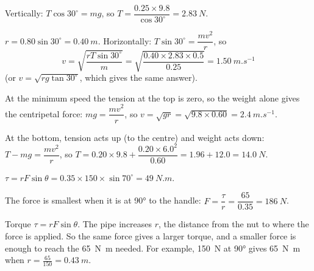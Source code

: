 \documentclass[12pt]{article}
\begin{document}
\ansq
{}
\begin{crit}
\end{crit}
\sample
Vertically: $T\cos 30^\circ = mg$, so $T = \dfrac{0.25 \times 9.8}{\cos 30^\circ} = \qty{2.83}{N}$.
\begin{crit}
\end{crit}
\sample
$r = 0.80\sin 30^\circ = \qty{0.40}{m}$. Horizontally: $T\sin 30^\circ = \dfrac{mv^2}{r}$, so
\[ v = \sqrt{\frac{rT\sin 30^\circ}{m}} = \sqrt{\frac{0.40 \times 2.83 \times 0.5}{0.25}} = \qty{1.50}{m.s^{-1}} \]
(or $v = \sqrt{rg\tan 30^\circ}$, which gives the same answer).

\ansq
{}
\begin{crit}
\end{crit}
\sample
At the minimum speed the tension at the top is zero, so the weight alone gives the centripetal
force: $mg = \dfrac{mv^2}{r}$, so $v = \sqrt{gr} = \sqrt{9.8 \times 0.60} = \qty{2.4}{m.s^{-1}}$.
\begin{crit}
\end{crit}
\sample
At the bottom, tension acts up (to the centre) and weight acts down:
$T - mg = \dfrac{mv^2}{r}$, so
$T = 0.20 \times 9.8 + \dfrac{0.20 \times 6.0^2}{0.60} = 1.96 + 12.0 = \qty{14.0}{N}$.

\ansq
{}
\begin{crit}
\end{crit}
\sample
$\tau = rF\sin\theta = 0.35 \times 150 \times \sin 70^\circ = \qty{49}{N.m}$.
\begin{crit}
\end{crit}
\sample
The force is smallest when it is at \ang{90} to the handle: $F = \dfrac{\tau}{r} = \dfrac{65}{0.35}
= \qty{186}{N}$.
\begin{crit}
\end{crit}
\sample
Torque $\tau = rF\sin\theta$. The pipe increases $r$, the distance from the nut to where the force is
applied. So the same force gives a larger torque, and a smaller force is enough to reach the
\qty{65}{N.m} needed. For example, \qty{150}{N} at \ang{90} gives \qty{65}{N.m} when
$r = \frac{65}{150} = \qty{0.43}{m}$.
\end{document}
